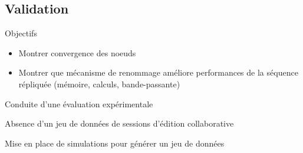 \subsection{Validation}

\begin{frame}{Objectifs}
  \begin{itemize}
    \item Montrer convergence des noeuds
    \item Montrer que mécanisme de renommage améliore performances de la séquence répliquée (mémoire, calculs, bande-passante)
  \end{itemize}
  \pause
  \begin{center}
    \alert{Conduite d'une évaluation expérimentale}
  \end{center}
\end{frame}

\begin{frame}[standout]
  \alert{Absence d'un jeu de données de sessions d'édition collaborative}

  \medskip
  \pause
  Mise en place de simulations pour générer un jeu de données
\end{frame}

